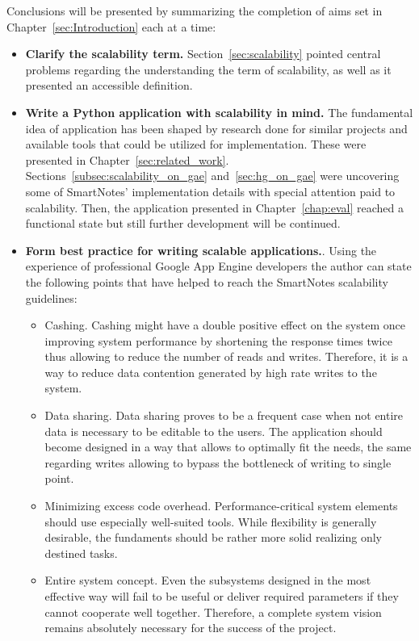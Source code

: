 Conclusions will be presented by summarizing the completion of aims set in Chapter~\ref{sec:Introduction} each at a time:
\begin{itemize}
\item{\textbf{Clarify the scalability term.} Section~\ref{sec:scalability} pointed central problems regarding the understanding the term of scalability, as well as it presented an accessible definition.}
\item{\textbf{Write a Python application with scalability in mind.} The fundamental idea of application has been shaped by research done for similar projects and available tools that could be utilized for implementation. These were presented in Chapter~\ref{sec:related_work}. Sections~\ref{subsec:scalability_on_gae} and~\ref{sec:hg_on_gae} were uncovering some of SmartNotes' implementation details with special attention paid to scalability. Then, the application presented in Chapter~\ref{chap:eval} reached a functional state but still further development will be continued.}
\item{\textbf{Form best practice for writing scalable applications.}. Using the experience of professional Google App Engine developers \cite{gae_best_practices, mike_malone_quote} the author can state the following points that have helped to reach the SmartNotes scalability guidelines:
\begin{itemize}
\item{Cashing. Cashing might have a double positive effect on the system once improving system performance by shortening the response times twice thus allowing to reduce the number of reads and writes. Therefore, it is a way to reduce data contention generated by high rate writes to the system.}
\item{Data sharing. Data sharing proves to be a frequent case when not entire data is necessary to be editable to the users. The application should become designed in a way that allows to optimally fit the needs, the same regarding writes allowing to bypass the bottleneck of writing to single point.}
\item{Minimizing excess code overhead. Performance-critical system elements should use especially well-suited tools. While flexibility is generally desirable, the fundaments should be rather more solid realizing only destined tasks.}
\item{Entire system concept. Even the subsystems designed in the most effective way will fail to be useful or deliver required parameters if they cannot cooperate well together. Therefore, a complete system vision remains absolutely necessary for the success of the project.}
\end{itemize}
}
\end{itemize} 